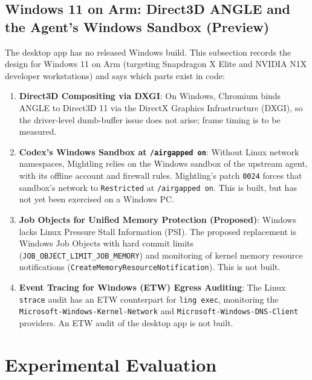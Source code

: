 \documentclass[11pt]{article}
\newcommand{\code}[1]{\texttt{#1}}
\newcommand{\agon}{\code{/airgapped on}}
\begin{document}
\subsection{Windows 11 on Arm: Direct3D ANGLE and the Agent's Windows Sandbox (Preview)}

The desktop app has no released Windows build. This subsection records the design for Windows 11 on Arm (targeting
Snapdragon X Elite and NVIDIA N1X developer workstations) and says which parts exist in code:
\begin{enumerate}
    \item \textbf{Direct3D Compositing via DXGI}: On Windows, Chromium binds ANGLE to Direct3D 11 via the DirectX Graphics
    Infrastructure (DXGI), so the driver-level dumb-buffer issue does not arise; frame timing is to be measured.
    \item \textbf{Codex's Windows Sandbox at \agon}: Without Linux network namespaces, Mightling relies on the Windows sandbox
    of the upstream agent, with its offline account and firewall rules. Mightling's patch \code{0024} forces that sandbox's
    network to \code{Restricted} at \agon. This is built, but has not yet been exercised on a Windows PC.
    \item \textbf{Job Objects for Unified Memory Protection (Proposed)}: Windows lacks Linux Pressure Stall Information (PSI).
    The proposed replacement is Windows Job Objects with hard commit limits (\code{JOB\_OBJECT\_LIMIT\_JOB\_MEMORY}) and
    monitoring of kernel memory resource notifications (\code{CreateMemoryResourceNotification}). This is not built.
    \item \textbf{Event Tracing for Windows (ETW) Egress Auditing}: The Linux \code{strace} audit has an ETW counterpart for
    \code{ling exec}, monitoring the \code{Microsoft-Windows-Kernel-Network} and \code{Microsoft-Windows-DNS-Client}
    providers. An ETW audit of the desktop app is not built.
\end{enumerate}

\section{Experimental Evaluation}
\label{sec:eval-detailed}
\end{document}
